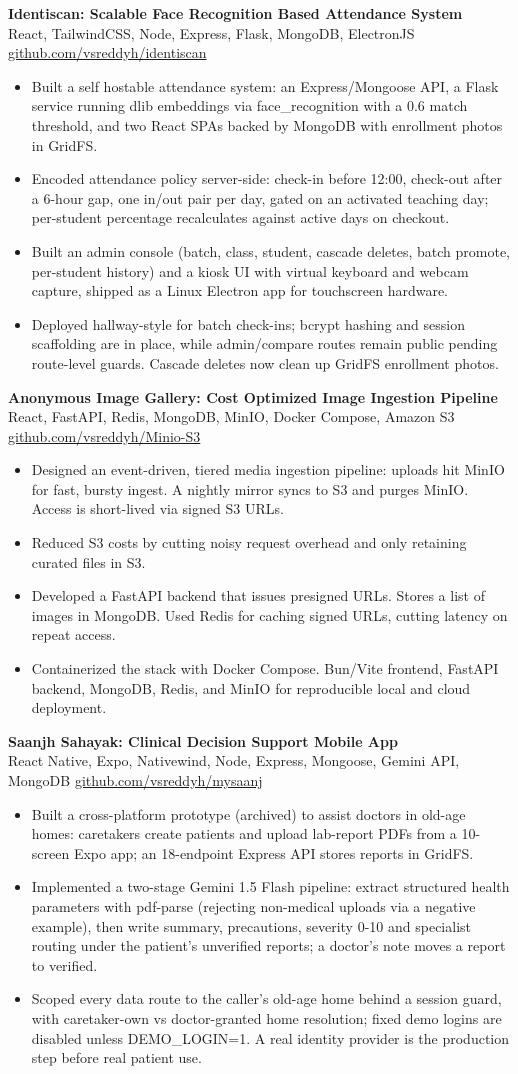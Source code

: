 \documentclass[a4paper,11pt]{article}
\newcommand{\resumeItem}[1]{\item \small{#1}}
\newcommand{\resumeSubheading}[4]{%
  \textbf{#1} \hfill \textbf{#2} \\
{#3} \hfill {#4}
}
\newcommand{\resumeSubHeadingListStart}{\begin{itemize}}
\newcommand{\resumeSubHeadingListEnd}{\end{itemize}}
\begin{document}
\resumeSubheading{Identiscan: Scalable Face Recognition Based Attendance System}{}{React, TailwindCSS, Node, Express, Flask, MongoDB, ElectronJS}{\href{https://github.com/vsreddyh/identiscan}{github.com/vsreddyh/identiscan}}
\resumeSubHeadingListStart
\resumeItem{Built a self hostable attendance system: an Express/Mongoose API, a Flask service running dlib embeddings via face\_recognition with a 0.6 match threshold, and two React SPAs backed by MongoDB with enrollment photos in GridFS.}
\resumeItem{Encoded attendance policy server-side: check-in before 12:00, check-out after a 6-hour gap, one in/out pair per day, gated on an activated teaching day; per-student percentage recalculates against active days on checkout.}
\resumeItem{Built an admin console (batch, class, student, cascade deletes, batch promote, per-student history) and a kiosk UI with virtual keyboard and webcam capture, shipped as a Linux Electron app for touchscreen hardware.}
\resumeItem{Deployed hallway-style for batch check-ins; bcrypt hashing and session scaffolding are in place, while admin/compare routes remain public pending route-level guards. Cascade deletes now clean up GridFS enrollment photos.}
\resumeSubHeadingListEnd

\resumeSubheading
{Anonymous Image Gallery: Cost Optimized Image Ingestion Pipeline}{}{React, FastAPI, Redis, MongoDB, MinIO, Docker Compose, Amazon S3}{\href{https://github.com/vsreddyh/Minio-S3}{github.com/vsreddyh/Minio-S3}}
\resumeSubHeadingListStart
\resumeItem{Designed an event-driven, tiered media ingestion pipeline: uploads hit MinIO for fast, bursty ingest. A nightly mirror syncs to S3 and purges MinIO. Access is short-lived via signed S3 URLs.}
\resumeItem{Reduced S3 costs by cutting noisy request overhead and only retaining curated files in S3.}
\resumeItem{Developed a FastAPI backend that issues presigned URLs. Stores a list of images in MongoDB. Used Redis for caching signed URLs, cutting latency on repeat access.}
\resumeItem{Containerized the stack with Docker Compose. Bun/Vite frontend, FastAPI backend, MongoDB, Redis, and MinIO for reproducible local and cloud deployment.}
\resumeSubHeadingListEnd

\resumeSubheading
{Saanjh Sahayak: Clinical Decision Support Mobile App}{}{React Native, Expo, Nativewind, Node, Express, Mongoose, Gemini API, MongoDB}{\href{https://github.com/vsreddyh/mysaanj}{github.com/vsreddyh/mysaanj}}
\resumeSubHeadingListStart
\resumeItem{Built a cross-platform prototype (archived) to assist doctors in old-age homes: caretakers create patients and upload lab-report PDFs from a 10-screen Expo app; an 18-endpoint Express API stores reports in GridFS.}
\resumeItem{Implemented a two-stage Gemini 1.5 Flash pipeline: extract structured health parameters with pdf-parse (rejecting non-medical uploads via a negative example), then write summary, precautions, severity 0-10 and specialist routing under the patient's unverified reports; a doctor's note moves a report to verified.}
\resumeItem{Scoped every data route to the caller's old-age home behind a session guard, with caretaker-own vs doctor-granted home resolution; fixed demo logins are disabled unless DEMO\_LOGIN=1. A real identity provider is the production step before real patient use.}
\resumeSubHeadingListEnd
\end{document}
